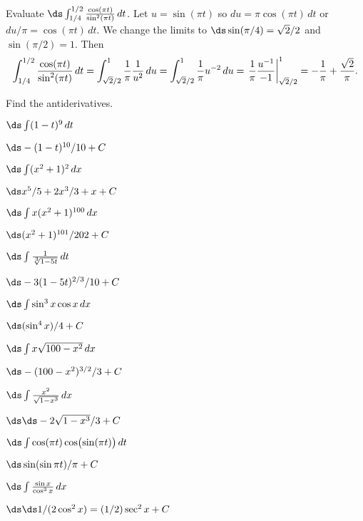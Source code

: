 \begin{example}
Evaluate $\ds\int_{1/4}^{1/2}{\cos(\pi t)\over\sin^2(\pi t)}\,dt$.
Let $u=\sin(\pi t)$ so $du=\pi\cos(\pi t)\,dt$ or $du/\pi=\cos(\pi
t)\,dt$. We change the limits to $\ds \sin(\pi/4)=\sqrt2/2$ and 
$\sin(\pi/2)=1$.
Then
$$
  \int_{1/4}^{1/2}{\cos(\pi t)\over\sin^2(\pi t)}\,dt=
  \int_{\sqrt2/2}^{1}{1\over \pi}{1\over u^2}\,du=
  \int_{\sqrt2/2}^{1} {1\over \pi}u^{-2}\,du=
  \left.{1\over \pi}{u^{-1}\over -1}\right|_{\sqrt2/2}^{1}=
  -{1\over\pi}+{\sqrt2\over\pi}.
$$
\vskip-10pt\end{example}

\begin{exercises}

Find the antiderivatives.


\twocol

\exercise $\ds\int (1-t)^9\,dt$
\begin{answer} $\ds -(1-t)^{10}/10+C$
\end{answer}

\exercise $\ds\int (x^2+1)^2\,dx$
\begin{answer} $\ds x^5/5+2x^3/3+x+C$
\end{answer}

\exercise $\ds\int x(x^2+1)^{100}\,dx$
\begin{answer} $\ds (x^2+1)^{101}/202+C$
\end{answer}

\exercise $\ds\int {1\over\root 3 \of {1-5t}}\,dt$ 
\begin{answer} $\ds -3(1-5t)^{2/3}/10+C$
\end{answer}

\exercise $\ds\int \sin^3x\cos x\,dx$
\begin{answer} $\ds (\sin^4x)/4+C$
\end{answer}

\exercise $\ds\int x\sqrt{100-x^2}\,dx$
\begin{answer} $\ds -(100-x^2)^{3/2}/3+C$
\end{answer}

\exercise $\ds\int {x^2\over\sqrt{1-x^3}}\,dx$
\begin{answer} $\ds \ds -2\sqrt{1-x^3}/3+C$
\end{answer}

\exercise $\ds\int \cos(\pi t)\cos\bigl(\sin(\pi t)\bigr)\,dt$
\begin{answer} $\ds \sin(\sin\pi t)/\pi+C$
\end{answer}

\exercise $\ds\int {\sin x\over\cos^3 x}\,dx$
\begin{answer} $\ds \ds 1/(2\cos^2 x)=(1/2)\sec^2x+C$
\end{answer}


\end{exercises}
